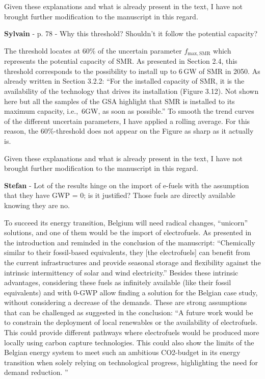 \documentclass[12pt,a4paper]{article}
\def\ie{i.e.,\ }
\begin{document}
Given these explanations and what is already present in the text, I have not brought further modification to the manuscript in this regard.

\begin{mdframed}[style=comment] %
{\color{purple} \textbf{Sylvain}} - p. 78 - Why this threshold? Shouldn't it follow the potential capacity?
\end{mdframed}

\noindent The threshold locates at 60\% of the uncertain parameter $f_{\mathrm{max,SMR}}$ which represents the potential capacity of SMR. As presented in Section 2.4, this threshold corresponds to the possibility to install up to 6\,GW of SMR in 2050. As already written in Section 3.2.2: ``For the installed capacity of SMR, it is the availability of the technology that drives its installation (Figure 3.12). Not shown here but all the samples of the GSA highlight that SMR is installed to its maximum capacity, \ie 6GW, as soon as possible.'' To smooth the trend curves of the different uncertain parameters, I have applied a rolling average.  For this reason, the 60\%-threshold does not appear on the Figure as sharp as it actually is.

Given these explanations and what is already present in the text, I have not brought further modification to the manuscript in this regard.

\begin{mdframed}[style=comment] %
{\color{teal} \textbf{Stefan}} - Lot of the results hinge on the import of e-fuels with the assumption that they have GWP = 0; is it justified? Those fuels are directly available knowing they are no.
\end{mdframed}

\noindent To succeed its energy transition, Belgium will need radical changes, ``unicorn'' solutions, and one of them would be the import of electrofuels. As presented in the introduction and reminded in the conclusion of the manuscript: ``Chemically similar to their fossil-based equivalents, they [the electrofuels] can benefit from the current infrastructures and provide seasonal storage and flexibility against the intrinsic intermittency of solar and wind electricity.'' Besides these intrinsic advantages, considering these fuels as infinitely available (like their fossil equivalents) and with 0-GWP allow finding a solution for the Belgian case study, without considering a decrease of the demands.  These are strong assumptions that can be challenged as suggested in the conclusion: ``A future work would be to constrain the deployment of local renewables or the availability of electrofuels. This could provide different pathways where electrofuels would be produced more locally using carbon capture technologies. This could also show the limits of the Belgian energy system to meet such an ambitious CO2-budget in its energy transition when solely relying on technological progress, highlighting the need for demand reduction. ''
\end{document}
